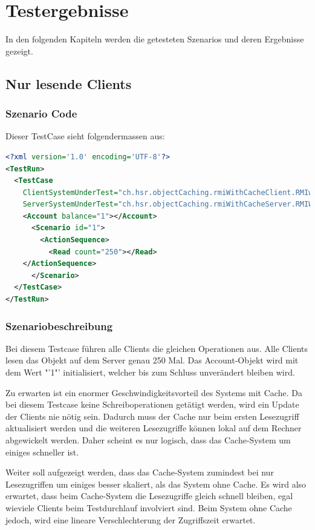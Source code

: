 \section{Testergebnisse}
In den folgenden Kapiteln werden die getesteten Szenarios und deren Ergebnisse gezeigt. 

\subsection{Nur lesende Clients}
\subsubsection{Szenario Code}
Dieser TestCase sieht folgendermassen aus:
\begin{lstlisting}[language=XML, breaklines=true]
<?xml version='1.0' encoding='UTF-8'?>
<TestRun>
  <TestCase
    ClientSystemUnderTest="ch.hsr.objectCaching.rmiWithCacheClient.RMIwithCacheClientSystem"
    ServerSystemUnderTest="ch.hsr.objectCaching.rmiWithCacheServer.RMIWithCacheServerSystem">
    <Account balance="1"></Account>
      <Scenario id="1">
        <ActionSequence>
          <Read count="250"></Read>
	</ActionSequence>
      </Scenario>
  </TestCase>
</TestRun>
\end{lstlisting}

\subsubsection{Szenariobeschreibung}
Bei diesem Testcase führen alle Clients die gleichen Operationen aus. Alle Clients lesen das Objekt auf dem Server genau 250 Mal. Das Account-Objekt wird mit dem Wert "'1"' initialisiert, welcher bis zum Schluss unverändert bleiben wird. 


Zu erwarten ist ein enormer Geschwindigkeitsvorteil des Systems mit Cache. Da bei diesem Testcase keine Schreiboperationen getätigt werden, wird ein Update der Clients nie nötig sein. Dadurch muss der Cache nur beim ersten Lesezugriff aktualisiert werden und die weiteren Lesezugriffe können lokal auf dem Rechner abgewickelt werden. Daher scheint es nur logisch, dass das Cache-System um einiges schneller ist.


Weiter soll aufgezeigt werden, dass das Cache-System zumindest bei nur Lesezugriffen um einiges besser skaliert, als das System ohne Cache. Es wird also erwartet, dass beim Cache-System die Lesezugriffe gleich schnell bleiben, egal wieviele Clients beim Testdurchlauf involviert sind. Beim System ohne Cache jedoch, wird eine lineare Verschlechterung der Zugriffszeit erwartet.

